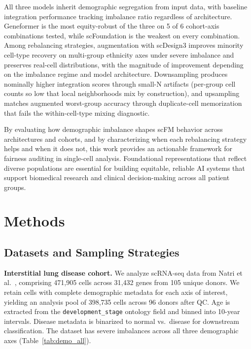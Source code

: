 \documentclass[sigconf]{acmart}
\begin{document}
All three models inherit demographic segregation from input data, with baseline integration performance tracking imbalance ratio regardless of architecture. Geneformer is the most equity-robust of the three on 5 of 6 cohort-axis combinations tested, while scFoundation is the weakest on every combination. Among rebalancing strategies, augmentation with scDesign3 improves minority cell-type recovery on multi-group ethnicity axes under severe imbalance and preserves real-cell distributions, with the magnitude of improvement depending on the imbalance regime and model architecture. Downsampling produces nominally higher integration scores through small-N artifacts (per-group cell counts so low that local neighborhoods mix by construction), and upsampling matches augmented worst-group accuracy through duplicate-cell memorization that fails the within-cell-type mixing diagnostic.

By evaluating how demographic imbalance shapes scFM behavior across architectures and cohorts, and by characterizing when each rebalancing strategy helps and when it does not, this work provides an actionable framework for fairness auditing in single-cell analysis. Foundational representations that reflect diverse populations are essential for building equitable, reliable AI systems that support biomedical research and clinical decision-making across all patient groups.
\section{Methods}

\subsection{Datasets and Sampling Strategies}

\textbf{Interstitial lung disease cohort.} We analyze scRNA-seq data from 
Natri et al.~\cite{natri2024ild}, comprising 471{,}905 cells across 31{,}432 
genes from 105 unique donors. We retain cells with complete demographic 
metadata for each axis of interest, yielding an analysis pool of 398{,}735 
cells across 96 donors after QC. Age is extracted from the \texttt{development\_stage} ontology 
field and binned into 10-year intervals. Disease metadata is binarized to 
normal vs.\ disease for downstream classification. The dataset has severe imbalances across 
all three demographic axes (Table~\ref{tab:demo_all}).
\end{document}
